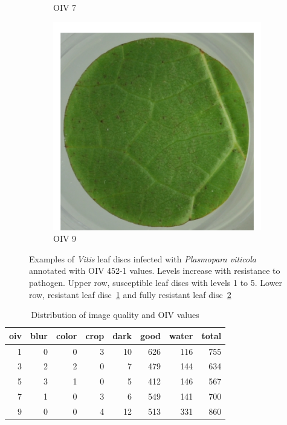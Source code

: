 \documentclass[english]{article}
\begin{document}
\begin{figure}[H]
\begin{subfigure}[b]{0.3\linewidth}
        \caption{OIV 7}\label{fig:oiv7}
    \end{subfigure}
    \begin{subfigure}[b]{0.3\linewidth}
        \includegraphics[width=\linewidth]{oiv9.png}
        \caption{OIV 9}\label{fig:oiv9}
    \end{subfigure}
    \caption{Examples of \textit{Vitis} leaf discs infected with \textit{Plasmopara viticola} annotated with OIV 452-1 values. Levels increase with resistance to pathogen. Upper row, susceptible leaf discs with levels 1 to 5. Lower row, resistant leaf disc~\ref{fig:oiv7} and fully resistant leaf disc~\ref{fig:oiv9}}\label{fig:phenotypes}
\end{figure}

\begin{table}[H]
\centering
\caption{Distribution of image quality and OIV values}
\label{tab:dataoivcount}
\begin{tabular}{rrrrrrrr}
\toprule
 oiv &  blur &  color &  crop &  dark &  good &  water &  total \\
\midrule
   1 &     0 &      0 &     3 &    10 &   626 &    116 &    755 \\
   3 &     2 &      2 &     0 &     7 &   479 &    144 &    634 \\
   5 &     3 &      1 &     0 &     5 &   412 &    146 &    567 \\
   7 &     1 &      0 &     3 &     6 &   549 &    141 &    700 \\
   9 &     0 &      0 &     4 &    12 &   513 &    331 &    860 \\
\bottomrule
\end{tabular}
\end{table}
\end{document}
